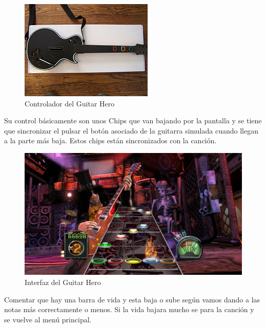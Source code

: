 \documentclass[a4paper,11pt,oneside]{book}
\begin{document}
\begin{figure}[H]
\begin{center}
\includegraphics[scale=2.0]{Imagenes/Guitar_Hero_3_controller.jpg}
\caption{Controlador del Guitar Hero}
\label{Controlador del Guitar Hero}
\end{center}
\end{figure}


Su control básicamente son unos \gls{Chips}  que van bajando por la pantalla y se tiene que sincronizar el pulsar el botón asociado de la guitarra simulada cuando llegan a la parte más baja. Estos chips están sincronizados con la canción.


\begin{figure}[H]
\begin{center}
\includegraphics[scale=0.3]{Imagenes/guitar-hero-3.jpg}
\caption{Interfaz del Guitar Hero}
\label{Interfaz del Guitar Hero}
\end{center}
\end{figure}

Comentar que hay una barra de vida y esta baja o sube según vamos dando a las notas más correctamente o menos. Si la vida bajara mucho se para la canción y se vuelve al menú principal.
\end{document}
